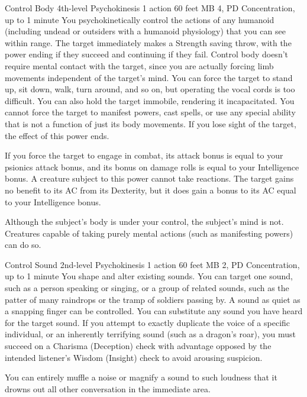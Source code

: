 \DndPowerHeader%
  {Control Body}
  {4th-level Psychokinesis}
  {1 action}
  {60 feet}
  {MB 4, PD \lvlfour}
  {Concentration, up to 1 minute}
You psychokinetically control the actions of any humanoid
(including undead or outsiders with a humanoid physiology)
that you can see within range.
The target immediately makes a Strength saving throw,
with the power ending if they succeed
and continuing if they fail.
Control body doesn't require mental contact with the target,
since you are actually forcing limb movements independent
of the target's mind.
You can force the target to stand up,
sit down,
walk,
turn around,
and so on,
but operating the vocal cords is too difficult.
You can also hold the target immobile,
rendering it incapacitated.
You cannot force the target to manifest powers,
cast spells,
or use any special ability that is not a function
of just its body movements.
If you lose sight of the target,
the effect of this power ends.

If you force the target to engage in combat,
its attack bonus is equal to your
psionics attack bonus,
and its bonus on damage rolls is equal
to your Intelligence bonus.
A creature subject to this power cannot take reactions.
The target gains no benefit to its AC from its Dexterity,
but it does gain a bonus to its AC
equal to your Intelligence bonus.

Although the subject's body is under your control,
the subject's mind is not.
Creatures capable of taking purely mental actions
(such as manifesting powers)
can do so.

\DndPowerHeader%
  {Control Sound}
  {2nd-level Psychokinesis}
  {1 action}
  {60 feet}
  {MB 2, PD \lvltwo}
  {Concentration, up to 1 minute}
You shape and alter existing sounds.
You can target one sound,
such as a person speaking or singing,
or a group of related sounds,
such as the patter of many raindrops
or the tramp of soldiers passing by.
A sound as quiet as a snapping finger can be controlled.
You can substitute any sound you have heard
for the target sound.
If you attempt to exactly duplicate the voice
of a specific individual,
or an inherently terrifying sound (such as a dragon's roar),
you must succeed on a
Charisma (Deception) check with advantage
opposed by the intended listener's Wisdom (Insight) check
to avoid arousing suspicion.

You can entirely muffle a noise or magnify a sound
to such loudness that it drowns out
all other conversation in the immediate area.

